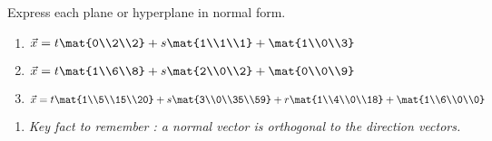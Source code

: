 \begin{exercises}
\begin{problist}
		\prob Express each plane or hyperplane in normal form.
		\begin{enumerate}
			\item $\vec x = t\mat{0\\2\\2}+s\mat{1\\1\\1}+\mat{1\\0\\3}$
			\item $\vec x = t\mat{1\\6\\8}+s\mat{2\\0\\2}+\mat{0\\0\\9}$
			\item $\vec x = t\mat{1\\5\\15\\20}+s\mat{3\\0\\35\\59}+
			r\mat{1\\4\\0\\18}+\mat{1\\6\\0\\0}$
		\end{enumerate}
		\begin{solution}
			\begin{enumerate}
				\item \textit{Key fact to remember : a normal vector is orthogonal to the direction vectors.} \\ \\


\end{enumerate}
\end{solution}
\end{problist}
\end{exercises}
